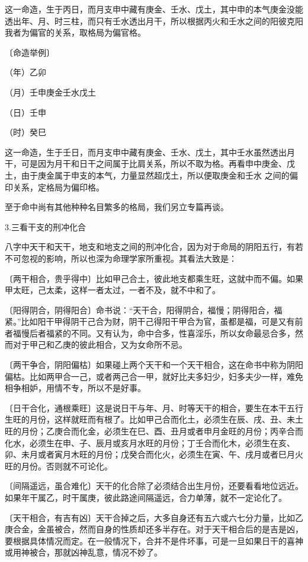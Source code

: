 \documentclass[a5paper,oneside,12pt]{ctexbook}
\begin{document}
这一命造，生于丙日，而月支申中藏有庚金、壬水、戊土，其中申的本气庚金没能透出年、月、时三柱，而只有壬水透出月干，所以根据丙火和壬水之间的阳彼克阳我者为偏官的关系，取格局为偏官格。

〔命造举例〕\par
（年）\quad{}乙卯\par
（月）\quad{}壬申{\scriptsize{庚金\quad{}壬水\quad{}戊土}}\par
（日）\quad{}壬申\par
（时）\quad{}癸巳\par

这一命造，生于壬日，而月支申中藏有庚金、壬水、戊土，其中壬水虽然透出月干，可是因为月干和日干之间属于比肩关系，所以不取为格。再看申中庚金、戊土，由于庚金属于申支的本气，力量显然超戊土，所以便取庚金和壬水
之间的偏印关系，定格局为偏印格。

至于命中尚有其他种种名目繁多的格局，我们另立专篇再谈。

3.三看干支的刑冲化合

八字中天干和天干，地支和地支之间的刑冲化合，因为对于命局的阴阳五行，有若不可忽视的影响，所以也深为命理学家所重视。其看法大致是：

〔两干相合，贵乎得中〕比如甲己合土，彼此地支都乘生旺，这就中而不偏。如果甲太旺，己太柔，这样一者太过，一者不及，就不中和了。

〔阳得阴合，阴得阳合〕命书说：“天干合，阳得阴合，福慢；阴得阳合，福紧。”比如阳干甲得阴干己合为财，阴干己得阳干甲合为官，虽都是福，可是又有前者福慢后者福紧的不同。又有认为，命中合多，性喜淫乐，所以女命最忌合多，然而对于甲己和乙庚的彼此相合，又为女命所不忌。

〔两干争合，阴阳偏枯〕如果碰上两个天干和一个天干相合，这在命书中称为阴阳偏枯。比如两甲合一己，或者两己合一甲，就好比夫多妇少，妇多夫少一样，难免相争相妒，用情不专，所以不是好事。

〔日干合化，通根乘旺〕这是说日干与年、月、时等天干的相合，要生在本干五行生旺的月份，这样就旺而有根了。比如甲己合而化土，必须生在辰、戌、丑、未土旺的月份；乙庚合而化金，必须生在巳、酉、丑月或者申月金旺的月份；丙辛合而化水，必须生在申、子、辰月或亥月水旺的月份；丁壬合而化木，必须生在亥、卯、未月或者寅月木旺的月份；戊癸合而化火，必须生在寅、午、戌月或者巳月火旺的月份。否则就不可论化。

〔间隔遥远，虽合难化〕天干的化合除了必须结合出生月份，还要看看地位远近。如果年干属乙，时干属庚，彼此路途间隔遥远，合力单薄，就不一定论化了。

〔天干相合，有吉有凶〕天干合掉之后，大多自身还有五六或六七分力量，比如乙庚合金，金虽被合，然而自身的性质却还多半存在。对于天干相合后的是吉是凶，要根据具体情况而定。在一般情况下，合并不是件坏事，可是一旦如果日干的喜神或用神被合，那就凶神乱意，情况不妙了。
\end{document}
